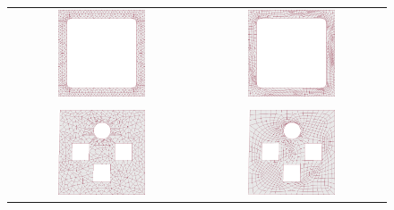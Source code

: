 \documentclass[a4paper,10pt]{report}
\title{}
\author{}
\begin{document}
\begin{figure}
\begin{tabular}{cc}
 \includegraphics[width = 0.49\textwidth]{frame0}&
 \includegraphics[width = 0.49\textwidth]{frame1}
\\
\\
\includegraphics[width = 0.49\textwidth]{WORMS0}&
\includegraphics[width = 0.49\textwidth]{WORMS1}

\end{tabular}
\end{figure}
\end{document}
